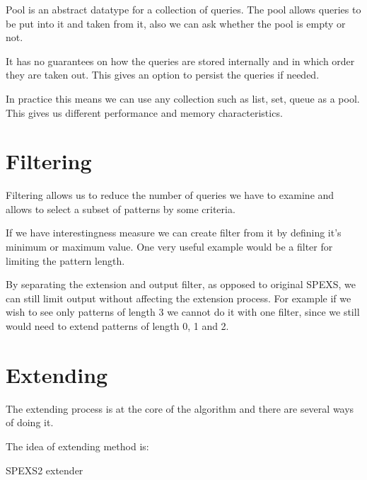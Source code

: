 Pool is an abstract datatype for a collection of queries. The pool
allows queries to be put into it and taken from it, also we can
ask whether the pool is empty or not.

It has no guarantees on how the queries are stored internally and
in which order they are taken out. This gives an option to persist the
queries if needed.

In practice this means we can use any collection such as list, set,
queue as a pool. This gives us different performance and memory characteristics.

\section{Filtering}

Filtering allows us to reduce the number of queries we have to examine and
allows to select a subset of patterns by some criteria.

If we have interestingness measure we can create filter from it by
defining it's minimum or maximum value. One very useful example 
would be a filter for limiting the pattern length.

By separating the extension and output filter, as opposed to original SPEXS, 
we can still limit output without affecting the extension process.
For example if we wish to see only patterns of length 3 we cannot do
it with one filter, since we still would need to extend patterns of length 0, 1 and 2.

\section{Extending}

The extending process is at the core of the algorithm and there are
several ways of doing it.

The idea of extending method is:

\begin{algorithm}[H]
	\caption{SPEXS2 extender}
\begin{algorithmic}[1]
	
	\EndFor

		\EndIf
	\EndFor

	\EndFor
\end{algorithmic}
\end{algorithm}

